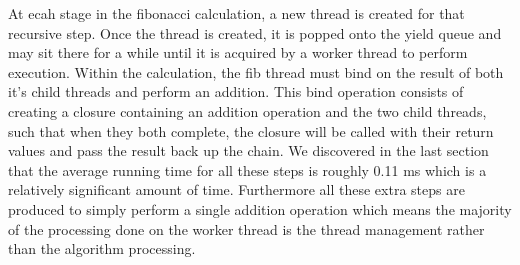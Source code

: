\documentclass[12pt,twoside,notitlepage]{report}
\begin{document}
%
%
At ecah stage in the fibonacci calculation, a new thread is created for that recursive step. Once the thread is created, it is popped onto the yield queue and may sit there for a while until it is acquired by a worker thread to
perform execution. Within the calculation, the fib thread must bind on the result of both it's child threads and perform an addition. This bind operation consists of creating a closure containing an addition operation and the two
child threads, such that when they both complete, the closure will be called with their return values and pass the result back up the chain. We discovered in the last section that the average running time for all these steps is
roughly 0.11 ms which is a relatively significant amount of time. Furthermore all these extra steps are produced to simply perform a single addition operation which means the majority of the processing done on the worker thread is the
thread management rather than the algorithm processing.

% 
\end{document}
